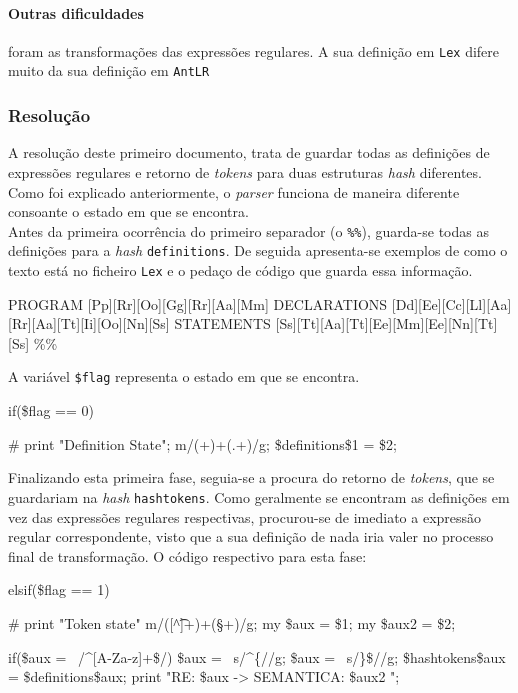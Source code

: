 \documentclass[11pt,a4paper]{article}
\begin{document}
\paragraph{Outras dificuldades} foram as transformações das expressões regulares. A sua definição em \texttt{Lex} difere muito da sua definição em \texttt{AntLR}

\subsubsection{Resolução}
A resolução deste primeiro documento, trata de guardar todas as definições de expressões regulares e retorno de \emph{tokens} para duas estruturas \emph{hash} diferentes.
Como foi explicado anteriormente, o \emph{parser} funciona de maneira diferente consoante o estado em que se encontra.\\

Antes da primeira ocorrência do primeiro separador (o \texttt{\%\%}), guarda-se todas as definições para a \emph{hash} \texttt{definitions}. De seguida apresenta-se exemplos de 
como o texto está no ficheiro \texttt{Lex} e o pedaço de código que guarda essa informação.\\

\begin{code_txt}
PROGRAM         [Pp][Rr][Oo][Gg][Rr][Aa][Mm]
DECLARATIONS    [Dd][Ee][Cc][Ll][Aa][Rr][Aa][Tt][Ii][Oo][Nn][Ss]
STATEMENTS      [Ss][Tt][Aa][Tt][Ee][Mm][Ee][Nn][Tt][Ss]
\%\%
\end{code_txt}

A variável \texttt{\$flag} representa o estado em que se encontra.\\

\begin{code_c}
        if(\$flag == 0){
        \#       print "Definition State\n";
                m/(\w+)\s+(.+)/g;
                \$definitions{\$1} = \$2;

        }
\end{code_c}

Finalizando esta primeira fase, seguia-se a procura do retorno de \emph{tokens}, que se guardariam na \emph{hash} \texttt{hashtokens}. Como geralmente se encontram as definições
em vez das expressões regulares respectivas, procurou-se de imediato a expressão regular correspondente, visto que a sua definição de nada iria valer no processo final de transformação.
O código respectivo para esta fase:\\

\begin{code_c}
        elsif(\$flag == 1){
        \#       print "Token state\n"
                m/([^\t\n]+)\s+(\S+)/g;
                my \$aux = \$1;
                my \$aux2 = \$2; 

                if(\$aux =~ /^{[A-Za-z]+}\$/){
                        \$aux =~ s/^\{//g;
                        \$aux =~ s/\}\$//g;
                        \$hashtokens{\$aux} = \$definitions{\$aux};
                }
                print "RE: \$aux -> SEMANTICA: \$aux2 \n";
        }
\end{code_c}
\end{document}

